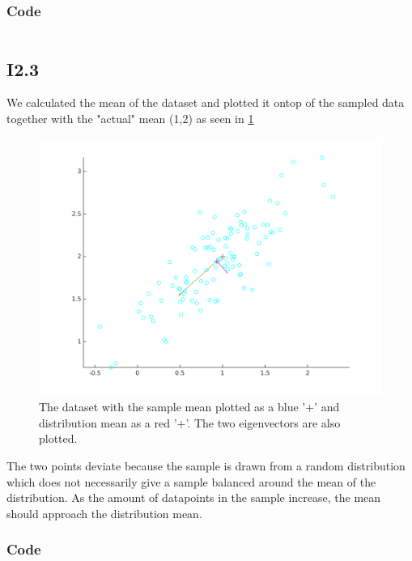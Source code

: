 \documentclass{article}
\begin{document}
\subsubsection{Code}

\inputminted{matlab}{part1/i22john.m}

\subsection{I2.3}


We calculated the mean of the dataset and plotted it ontop of the sampled
data together with the "actual" mean (1,2) as seen in \ref{fig:I3.1}

\begin{figure}[!ht]
    \centering
    \includegraphics[width=\textwidth]{part1/I231.png}
    \caption{The dataset with the sample mean plotted as a blue '+' and
    distribution mean as a red '+'. The two eigenvectors are also plotted.}
    \label{fig:I3.1}
\end{figure}

The two points deviate because the sample is drawn from a random
distribution which does not necessarily give a sample balanced around the
mean of the distribution. As the amount of datapoints in the sample
increase, the mean should approach the distribution mean.

\subsubsection{Code}

\inputminted{matlab}{part1/i23john.m}
\end{document}
